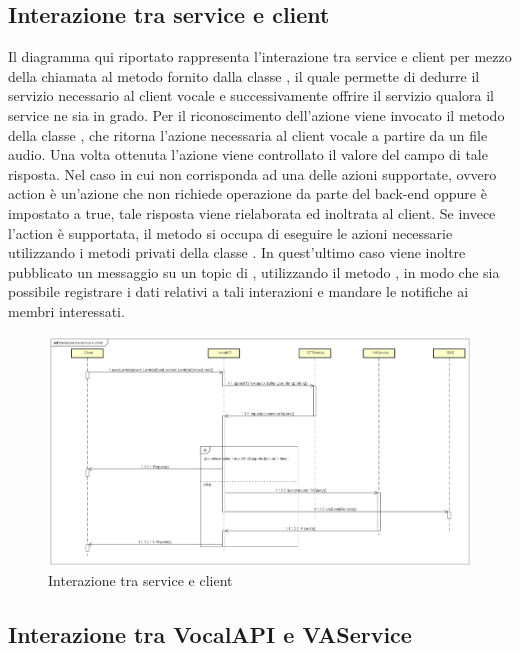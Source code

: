 \subsection{Interazione tra service e client}
Il diagramma qui riportato rappresenta l'interazione tra service e client per mezzo della chiamata al metodo  fornito dalla classe , il quale permette di dedurre il servizio necessario al client vocale e successivamente offrire il servizio qualora il service ne sia in grado. Per il riconoscimento dell'azione viene invocato il metodo  della classe , che ritorna l'azione necessaria al client vocale a partire da un file audio. Una volta ottenuta l'azione viene controllato il valore del campo  di tale risposta. Nel caso in cui  non corrisponda ad una delle azioni supportate, ovvero action è un'azione che non richiede operazione da parte del back-end oppure  è impostato a true, tale risposta viene rielaborata ed inoltrata al client. Se invece l'action è supportata, il metodo si occupa di eseguire le azioni necessarie utilizzando i metodi privati della classe . In quest'ultimo caso viene inoltre pubblicato un messaggio su un topic di , utilizzando il metodo , in modo che sia possibile registrare i dati relativi a tali interazioni e mandare le notifiche ai membri interessati.
 \begin{figure}[h]
  \centering
  \includegraphics[width=\textwidth,height=\textheight,keepaspectratio]{images/diagrams/back-end/Ufficial_Backend/Interazionetraserviceeclient.png}
 \caption{Interazione tra service e client}
\end{figure}
\newpage
\hypertarget{interazioneVocalAPIVAService}{\subsection{Interazione tra VocalAPI e VAService}}
